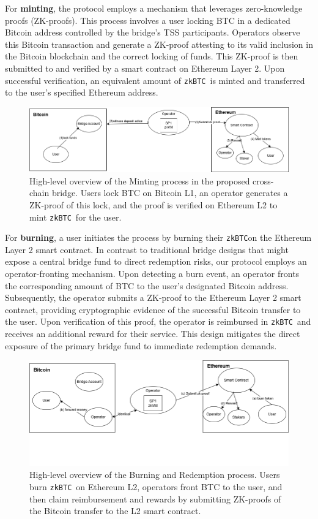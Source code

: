 \documentclass{DESSThesis}
\newcommand{\zktoken}{\texttt{zkBTC}}
\begin{document}
For \textbf{minting}, the protocol employs a mechanism that leverages zero-knowledge proofs (ZK-proofs). This process involves a user locking BTC in a dedicated Bitcoin address controlled by the bridge's TSS participants. Operators observe this Bitcoin transaction and generate a ZK-proof attesting to its valid inclusion in the Bitcoin blockchain and the correct locking of funds. This ZK-proof is then submitted to and verified by a smart contract on Ethereum Layer 2. Upon successful verification, an equivalent amount of \zktoken\ is minted and transferred to the user's specified Ethereum address.

\begin{figure}[htb!]
    \centering
    \includegraphics[width=15cm]{img/mint.png}
    \caption{High-level overview of the Minting process in the proposed cross-chain bridge. Users lock BTC on Bitcoin L1, an operator generates a ZK-proof of this lock, and the proof is verified on Ethereum L2 to mint \zktoken\ for the user.}
    \label{fig:mint_overview} %
\end{figure}

For \textbf{burning}, a user initiates the process by burning their \zktoken on the Ethereum Layer 2 smart contract. In contrast to traditional bridge designs that might expose a central bridge fund to direct redemption risks, our protocol employs an operator-fronting mechanism. Upon detecting a burn event, an operator fronts the corresponding amount of BTC to the user's designated Bitcoin address. Subsequently, the operator submits a ZK-proof to the Ethereum Layer 2 smart contract, providing cryptographic evidence of the successful Bitcoin transfer to the user. Upon verification of this proof, the operator is reimbursed in \zktoken\ and receives an additional reward for their service. This design mitigates the direct exposure of the primary bridge fund to immediate redemption demands.

\begin{figure}[htb!]
    \centering
    \includegraphics[width=12cm]{img/burn.png}
    \caption{High-level overview of the Burning and Redemption process. Users burn \zktoken\ on Ethereum L2, operators front BTC to the user, and then claim reimbursement and rewards by submitting ZK-proofs of the Bitcoin transfer to the L2 smart contract.}
    \label{fig:burn_overview} 
\end{figure}
\end{document}
